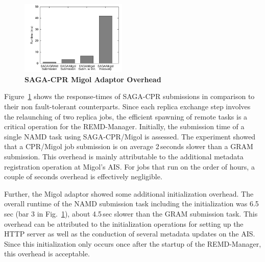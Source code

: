 \documentclass{rspublic}
\newcommand{\up}{}%
\newcommand{\jhanote}[1]{ {\textcolor{red} { ***SJ: #1 }}}
\newcommand{\jhanote}[1]{}
\begin{document}
\begin{figure}[ht]
    \centering
        \includegraphics[width=0.45\textwidth]{performance/perf_submission.pdf}
    \up
    \caption{\footnotesize \bf SAGA-CPR Migol Adaptor Overhead}
    \up
    \label{fig:performance_perf_submission}
\end{figure}           

Figure~\ref{fig:performance_perf_submission} shows the response-times
of SAGA-CPR submissions in comparison to their non fault-tolerant
counterparts. Since each replica exchange step involves the
relaunching of two replica jobs, the efficient spawning of remote
tasks is a critical operation for the REMD-Manager.
Initially, the submission time of a single NAMD task using
SAGA-CPR/Migol is assessed. The experiment showed that a CPR/Migol job
submission is on average 2\,seconds slower than a GRAM
submission. This overhead is mainly attributable to the additional
metadata registration operation at Migol's AIS. For jobs that run on
the order of hours, a couple of seconds overhead is effectively
negligible.

Further, the Migol adaptor showed some additional initialization
overhead. The overall runtime of the NAMD submission task including
the initialization was 6.5\,sec (bar 3 in
Fig.~\ref{fig:performance_perf_submission}), about 4.5\,sec slower
than the GRAM submission task. This overhead can be attributed to the
initialization operations for setting up the HTTP server as well as
the conduction of several metadata updates on the AIS. Since this
initialization only occurs once after the startup of the REMD-Manager,
this overhead is acceptable.
                                                                                                                    
\end{document}
